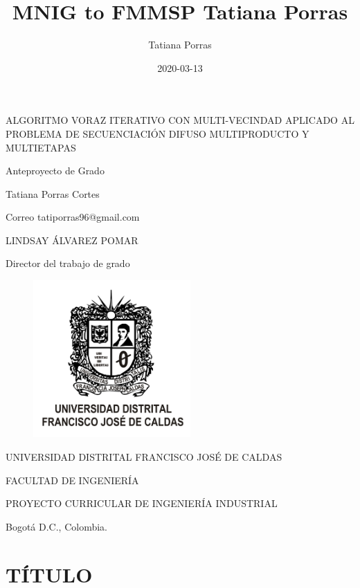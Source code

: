 \documentclass{article}
\title{MNIG to FMMSP Tatiana Porras}
\date{2020-03-13}
\author{Tatiana Porras}
\makeatletter
\let\dateVar\@date
\makeatother
\begin{document}
\begin{titlepage}
    \begin{center}
    ALGORITMO VORAZ ITERATIVO CON MULTI-VECINDAD APLICADO AL PROBLEMA DE SECUENCIACIÓN DIFUSO MULTIPRODUCTO Y MULTIETAPAS
    \par \bigskip
    Anteproyecto de Grado
    \par \vspace{5cm}
    Tatiana Porras Cortes
    \par \medskip
    Correo \hspace{1cm} tatiporras96@gmail.com
    \par \bigskip
    LINDSAY ÁLVAREZ POMAR \par Director del trabajo de grado
    \par \vspace{1cm}
    \begin{figure}[h!]
        \begin{center}
        \includegraphics[width=6cm]{EscudoUD1.png}
        \end{center}
    \end{figure}
    \par UNIVERSIDAD DISTRITAL FRANCISCO JOSÉ DE CALDAS
    \par FACULTAD DE INGENIERÍA
    \par PROYECTO CURRICULAR DE INGENIERÍA INDUSTRIAL
    \par Bogotá D.C., Colombia. \dateVar
    \end{center}
\end{titlepage}

\renewcommand{\contentsname}{Tabla de Contenido}

\tableofcontents

\setcounter{section}{-1}

\section{TÍTULO}
\end{document}
